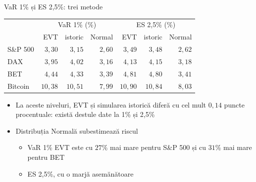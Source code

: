 \begin{frame}{VaR 1\% și ES 2,5\%: trei metode}
\itemsize{\footnotesize}
\begin{center}
\footnotesize
\begin{tabular}{l|rrr|rrr}
\toprule
& \multicolumn{3}{c|}{VaR 1\% (\%)} & \multicolumn{3}{c}{ES 2,5\% (\%)} \\ & EVT & istoric & Normal & EVT & istoric & Normal \\
\midrule
S\&P 500 & $3{,}30$ & $3{,}15$ & $2{,}60$ & $3{,}49$ & $3{,}48$ & $2{,}62$ \\
DAX & $3{,}95$ & $4{,}02$ & $3{,}16$ & $4{,}13$ & $4{,}15$ & $3{,}18$ \\
BET & $4{,}44$ & $4{,}33$ & $3{,}39$ & $4{,}81$ & $4{,}80$ & $3{,}41$ \\
Bitcoin & $10{,}38$ & $10{,}51$ & $7{,}99$ & $10{,}90$ & $10{,}84$ & $8{,}03$ \\
\bottomrule
\end{tabular}
\end{center}
\begin{itemize}
    \item La aceste niveluri, EVT și simularea istorică diferă cu cel mult $0{,}14$ puncte procentuale: există destule date la 1\% și 2,5\%
    \item Distribuția Normală subestimează riscul
    \begin{itemize}
        \item VaR 1\% EVT este cu $27\%$ mai mare pentru S\&P 500 și cu $31\%$ mai mare pentru BET
        \item ES 2,5\%, cu o marjă asemănătoare
    \end{itemize}
\end{itemize}
\end{frame}

